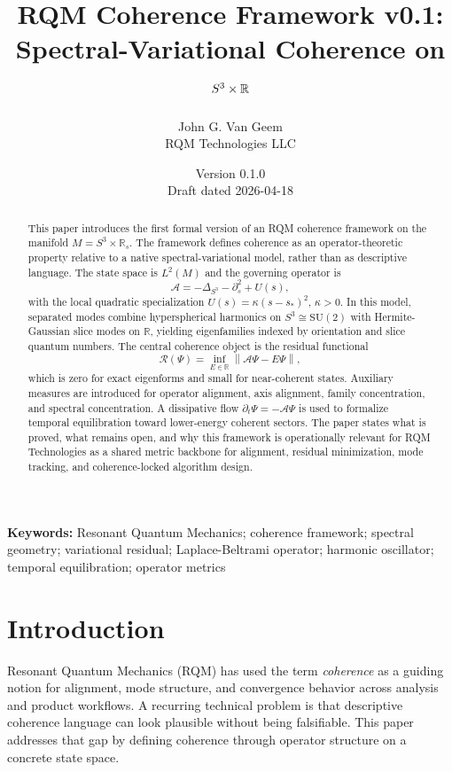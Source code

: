 \documentclass[11pt]{article}
\title{\textbf{RQM Coherence Framework v0.1:}\\ \textbf{Spectral-Variational Coherence on \texorpdfstring{$S^3 \times \R$}{S3 x R}}}
\author{John G. Van Geem\\RQM Technologies LLC}
\date{Version 0.1.0 \\ Draft dated 2026-04-18}
\theoremstyle{remark}
\newcommand{\R}{\mathbb{R}}
\newcommand{\SU}{\mathrm{SU}}
\newcommand{\Lp}{L^2}
\newcommand{\norm}[1]{\left\lVert #1 \right\rVert}
\newcommand{\Aop}{\mathcal{A}}
\newcommand{\Res}{\mathcal{R}}
\begin{document}
\maketitle

\begin{abstract}
This paper introduces the first formal version of an RQM coherence framework on the manifold $M=S^3\times\R_s$. The framework defines coherence as an operator-theoretic property relative to a native spectral-variational model, rather than as descriptive language. The state space is $\Lp(M)$ and the governing operator is
\[
\Aop = -\Delta_{S^3} - \partial_s^2 + U(s),
\]
with the local quadratic specialization $U(s)=\kappa(s-s_*)^2$, $\kappa>0$. In this model, separated modes combine hyperspherical harmonics on $S^3\cong\SU(2)$ with Hermite-Gaussian slice modes on $\R$, yielding eigenfamilies indexed by orientation and slice quantum numbers. The central coherence object is the residual functional
\[
\Res(\Psi)=\inf_{E\in\R}\norm{\Aop\Psi-E\Psi},
\]
which is zero for exact eigenforms and small for near-coherent states. Auxiliary measures are introduced for operator alignment, axis alignment, family concentration, and spectral concentration. A dissipative flow $\partial_t\Psi=-\Aop\Psi$ is used to formalize temporal equilibration toward lower-energy coherent sectors. The paper states what is proved, what remains open, and why this framework is operationally relevant for RQM Technologies as a shared metric backbone for alignment, residual minimization, mode tracking, and coherence-locked algorithm design.
\end{abstract}

\noindent\textbf{Keywords:} Resonant Quantum Mechanics; coherence framework; spectral geometry; variational residual; Laplace-Beltrami operator; harmonic oscillator; temporal equilibration; operator metrics

\section{Introduction}

Resonant Quantum Mechanics (RQM) has used the term \emph{coherence} as a guiding notion for alignment, mode structure, and convergence behavior across analysis and product workflows. A recurring technical problem is that descriptive coherence language can look plausible without being falsifiable. This paper addresses that gap by defining coherence through operator structure on a concrete state space.
\end{document}
